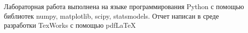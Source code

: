 Лабораторная работа выполнена на языке программирования Python с помощью библиотек numpy, matplotlib, scipy, statsmodels. Отчет написан в среде разработки TexWorks с помощью pdfLaTeX
